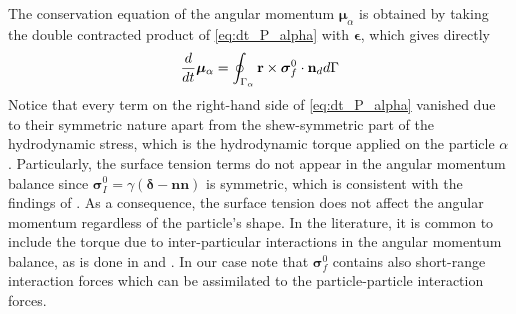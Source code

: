The conservation equation of the angular momentum $\bm{\mu}_\alpha$ is obtained by taking the double contracted product of \ref{eq:dt_P_alpha} with $\bm\epsilon$, which gives directly
\begin{equation}
    \frac{d}{dt}\bm{\mu}_\alpha
    =  
    \oint_{\Gamma_{\alpha}}  \textbf{r} \times \bm{\sigma}_f^0\cdot \textbf{n}_d  d\Gamma
    \label{eq:dt_mu_alpha}
\end{equation}
Notice that every term on the right-hand side of \ref{eq:dt_P_alpha} vanished due to their symmetric nature apart from the shew-symmetric part of the hydrodynamic stress, which is the hydrodynamic torque applied on the particle $\alpha$.
Particularly, the surface tension terms do not appear in the angular momentum balance since $\bm\sigma_I^0 = \gamma (\bm\delta-\textbf{nn})$ is symmetric, which is consistent with the findings of \citet{hesla1993note}. 
As a consequence, the surface tension does not affect the angular momentum regardless of the particle's shape. 
In the literature, it is common to include the torque due to inter-particular interactions in the angular momentum balance, as is done in \citet{jackson1997locally} and \citet{zhang1997momentum}.
In our case note that $\bm{\sigma}_f^0$ contains also short-range interaction forces which can be assimilated to the particle-particle interaction forces.

